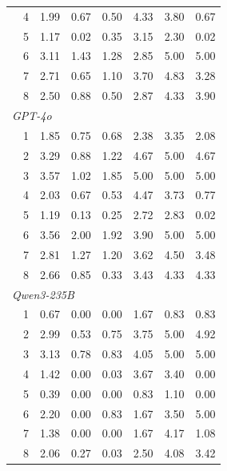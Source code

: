 \documentclass{article}
\begin{document}
\begin{table}[t]
\begin{tabular}{l c c c c c c c}
     & 4 & 1.99 & 0.67 & 0.50 & 4.33 & 3.80 & 0.67 \\
     & 5 & 1.17 & 0.02 & 0.35 & 3.15 & 2.30 & 0.02 \\
     & 6 & 3.11 & 1.43 & 1.28 & 2.85 & 5.00 & 5.00 \\
     & 7 & 2.71 & 0.65 & 1.10 & 3.70 & 4.83 & 3.28 \\
     & 8 & 2.50 & 0.88 & 0.50 & 2.87 & 4.33 & 3.90 \\
    \midrule
    \multicolumn{8}{l}{\textit{GPT-4o}} \\
     & 1 & 1.85 & 0.75 & 0.68 & 2.38 & 3.35 & 2.08 \\
     & 2 & 3.29 & 0.88 & 1.22 & 4.67 & 5.00 & 4.67 \\
     & 3 & 3.57 & 1.02 & 1.85 & 5.00 & 5.00 & 5.00 \\
     & 4 & 2.03 & 0.67 & 0.53 & 4.47 & 3.73 & 0.77 \\
     & 5 & 1.19 & 0.13 & 0.25 & 2.72 & 2.83 & 0.02 \\
     & 6 & 3.56 & 2.00 & 1.92 & 3.90 & 5.00 & 5.00 \\
     & 7 & 2.81 & 1.27 & 1.20 & 3.62 & 4.50 & 3.48 \\
     & 8 & 2.66 & 0.85 & 0.33 & 3.43 & 4.33 & 4.33 \\
    \midrule
    \multicolumn{8}{l}{\textit{Qwen3-235B}} \\
     & 1 & 0.67 & 0.00 & 0.00 & 1.67 & 0.83 & 0.83 \\
     & 2 & 2.99 & 0.53 & 0.75 & 3.75 & 5.00 & 4.92 \\
     & 3 & 3.13 & 0.78 & 0.83 & 4.05 & 5.00 & 5.00 \\
     & 4 & 1.42 & 0.00 & 0.03 & 3.67 & 3.40 & 0.00 \\
     & 5 & 0.39 & 0.00 & 0.00 & 0.83 & 1.10 & 0.00 \\
     & 6 & 2.20 & 0.00 & 0.83 & 1.67 & 3.50 & 5.00 \\
     & 7 & 1.38 & 0.00 & 0.00 & 1.67 & 4.17 & 1.08 \\
     & 8 & 2.06 & 0.27 & 0.03 & 2.50 & 4.08 & 3.42 \\
    \bottomrule
  \end{tabular}
\end{table}

\clearpage

\end{document}

